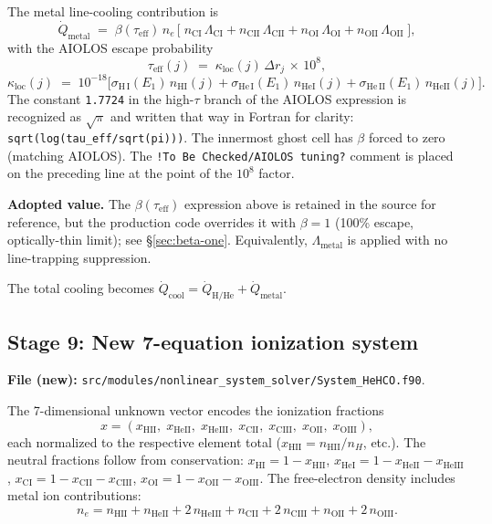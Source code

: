 \documentclass[english,a4paper]{my_memo}
\begin{document}
The metal line-cooling contribution is
\begin{equation}
\dot{Q}_{\mathrm{metal}} \;=\;
\beta(\tau_\mathrm{eff})\, n_{e}\,
\bigl[\;
n_\mathrm{CI}\,\Lambda_\mathrm{CI}
+ n_\mathrm{CII}\,\Lambda_\mathrm{CII}
+ n_\mathrm{OI}\,\Lambda_\mathrm{OI}
+ n_\mathrm{OII}\,\Lambda_\mathrm{OII}
\;\bigr],
\end{equation}
with the AIOLOS escape probability
\[
  \tau_\mathrm{eff}(j) \;=\; \kappa_{\mathrm{loc}}(j)\,\Delta r_j\,\times\,10^{8},
\]
\[
  \kappa_{\mathrm{loc}}(j) \;=\; 10^{-18}\bigl[
  \sigma_{\mathrm{H\,I}}(E_1)\,n_\mathrm{HI}(j) +
  \sigma_{\mathrm{He\,I}}(E_1)\,n_\mathrm{HeI}(j) +
  \sigma_{\mathrm{He\,II}}(E_1)\,n_\mathrm{HeII}(j)\bigr].
\]
The constant \texttt{1.7724} in the high-\(\tau\) branch of
the AIOLOS expression is recognized as
\(\sqrt{\pi}\) and written that way in Fortran for clarity:
\verb|sqrt(log(tau_eff/sqrt(pi)))|.  The innermost ghost
cell has \(\beta\) forced to zero (matching AIOLOS).  The
\texttt{!To Be Checked/AIOLOS tuning?} comment is placed on the
preceding line at the point of the \(10^{8}\) factor.

\textbf{Adopted value.}  The \(\beta(\tau_\mathrm{eff})\) expression
above is retained in the source for reference, but the production code
overrides it with \(\beta = 1\) (100\% escape, optically-thin limit);
see \S\ref{sec:beta-one}.  Equivalently, \(\Lambda_\mathrm{metal}\) is
applied with no line-trapping suppression.

The total cooling becomes
\(\dot{Q}_{\mathrm{cool}} = \dot{Q}_{\mathrm{H/He}} + \dot{Q}_{\mathrm{metal}}\).

\subsection{Stage 9: New 7-equation ionization system}
\textbf{File (new):} \texttt{src/modules/nonlinear\_system\_solver/System\_HeHCO.f90}.

The 7-dimensional unknown vector encodes the ionization fractions
\[
  x = (x_\mathrm{HII},\; x_\mathrm{HeII},\; x_\mathrm{HeIII},\;
       x_\mathrm{CII},\; x_\mathrm{CIII},\; x_\mathrm{OII},\; x_\mathrm{OIII}),
\]
each normalized to the respective element total
(\(x_\mathrm{HII} = n_\mathrm{HII}/n_H\), etc.).  The neutral fractions
follow from conservation:
\(x_\mathrm{HI} = 1 - x_\mathrm{HII}\),
\(x_\mathrm{HeI} = 1 - x_\mathrm{HeII} - x_\mathrm{HeIII}\),
\(x_\mathrm{CI} = 1 - x_\mathrm{CII} - x_\mathrm{CIII}\),
\(x_\mathrm{OI} = 1 - x_\mathrm{OII} - x_\mathrm{OIII}\).
The free-electron density includes metal ion contributions:
\[
  n_e = n_\mathrm{HII} + n_\mathrm{HeII} + 2\,n_\mathrm{HeIII}
      + n_\mathrm{CII} + 2\,n_\mathrm{CIII}
      + n_\mathrm{OII} + 2\,n_\mathrm{OIII}.
\]
\end{document}
